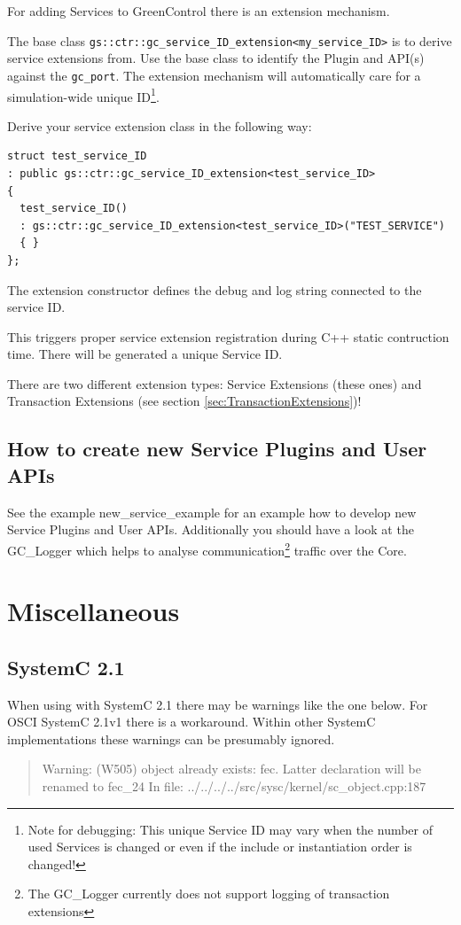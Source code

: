For adding Services to GreenControl there is an extension mechanism.

The base class \lstinline|gs::ctr::gc_service_ID_extension<my_service_ID>| is to derive service extensions from. 
Use the base class to identify the Plugin and API(s) against the \lstinline|gc_port|. The extension mechanism will automatically care for a simulation-wide unique ID\footnote{Note for debugging: This unique Service ID may vary when the number of used Services is changed or even if the include or instantiation order is changed!}.

Derive your service extension class in the following way:
\begin{lstlisting}
struct test_service_ID
: public gs::ctr::gc_service_ID_extension<test_service_ID>
{
  test_service_ID()
  : gs::ctr::gc_service_ID_extension<test_service_ID>("TEST_SERVICE") 
  { }
};
\end{lstlisting}

The extension constructor defines the debug and log string connected to the service ID.

This triggers proper service extension registration during C++ static
contruction time. There will be generated a unique Service ID.

 There are two different extension types: Service Extensions (these ones) and Transaction Extensions (see section \ref{sec:TransactionExtensions})!

\subsection{How to create new Service Plugins and User APIs}
See the example \textsf{new\_service\_example} for an example how to develop new Service Plugins and User APIs. Additionally you should have a look at the GC\_Logger which helps to analyse communication\footnote{The GC\_Logger currently does not support logging of transaction extensions} traffic over the Core.


\section{Miscellaneous}
\label{GCMiscellaneous}

\subsection{SystemC 2.1}
When using \GreenControl with SystemC 2.1 there may be warnings like the one below. For OSCI SystemC 2.1v1 there is a workaround. Within other SystemC implementations these warnings can be presumably ignored. \newline
\begin{quote}
{\sffamily Warning: (W505) object already exists: fec. Latter declaration will be renamed to fec\_24 \newline
In file: ../../../../src/sysc/kernel/sc\_object.cpp:187} \newline
\end{quote}
